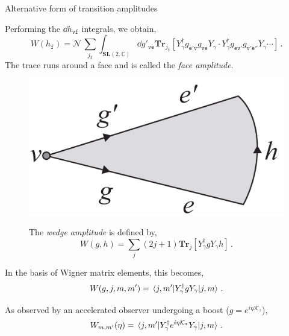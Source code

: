 \documentclass[12pt,titlepage]{article}
\begin{document}
\begin{frame}{Alternative form of transition amplitudes}
    \begin{list}{\,}{\leftmargin=1em \itemindent=0em}
        \item<1-> Performing the $\dd{h_\mathtt{vf}}$ integrals, we obtain,
        \begin{equation}
            W(h_\mathtt{f})=\mathcal{N}\,\sum_{j_\mathtt{f}}\int_{{\mathbf{SL}(2,\mathbb{C})}}\dd{g'_\mathtt{ve}}\mathbf{Tr}_{j_\mathtt{f}}[Y_\gamma^\dagger g_\mathtt{e'v}g_\mathtt{ve}Y_\gamma\cdot Y_\gamma^\dagger g_\mathtt{ev'}g_\mathtt{v'e''}Y_\gamma\cdots]\,.
        \end{equation}
        The trace runs around a face and is called the \textit{face amplitude}.
        \item<2-> \noindent\FloatBarrier
        \begin{figure}[!ht]
            \begin{minipage}{0.25\linewidth}
                \includegraphics[width=\linewidth]{4.13.png}
            \end{minipage}
            \begin{minipage}{0.75\linewidth}\centering
                The \textit{wedge amplitude} is defined by,
                \begin{equation}
                    W(g,h)=\sum_j(2j+1)\mathbf{Tr}_{j}[Y_\gamma^\dagger g Y_\gamma h]\,.
                \end{equation}
            \end{minipage}
        \end{figure}\FloatBarrier
        \item<3-> In the basis of Wigner matrix elements, this becomes,
        \begin{equation}
            W(g,j,m,m')=\mel{j,m'}{Y_\gamma^\dagger g Y_\gamma}{j,m}\,.
        \end{equation}
        \item<4-> As observed by an accelerated observer undergoing a boost ($g=e^{i\eta\mathcal{K}_z}$),
        \begin{equation}
            W_{m,m'}(\eta)=\mel{j,m'}{Y_\gamma^\dagger e^{i\eta\mathcal{K}_z} Y_\gamma}{j,m}\,.
        \end{equation}
    \end{list}
\end{frame}
\end{document}
